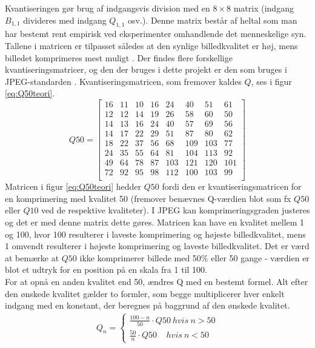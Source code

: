 Kvantiseringen gør brug af indgangsvis division med en $8 \times 8$ matrix (indgang $B_{1,1}$ divideres med indgang $Q_{1,1}$ osv.). Denne matrix består af heltal som man har bestemt rent empirisk ved eksperimenter omhandlende det menneskelige syn. Tallene i matricen er tilpasset således at den synlige billedkvalitet er høj, mens billedet komprimeres mest muligt \citep{lokminglui}. Der findes flere forskellige kvantiseringsmatricer, og den der bruges i dette projekt er den som bruges i JPEG-standarden \citep{lokminglui}. Kvantiseringsmatricen, som fremover kaldes $Q$, ses i figur \ref{eq:Q50teori}.
\begin{equation}
Q50 =
\begin{bmatrix}
	16	&	11	& 10		& 16		& 	24	&	40	& 51		& 61		\\
	12	&	12	& 14		& 19		& 	26	& 	58	& 60		& 50		\\
	14	&	13	& 16		& 24		& 	40	& 	57	& 69		& 56		\\
	14	&	17	& 22		& 29		& 	51	& 	87	& 80		& 62		\\
	18	&	22	& 37		& 56		& 	68	& 	109	& 103	& 77		\\
	24	&	35	& 55		& 64		& 	81	& 	104	& 113	& 92		\\
	49	&	64	& 78		& 87		& 	103	& 	121	& 120	& 101	\\
	72	&	92	& 95		& 98		& 	112	& 	100	& 103	& 99		\\
\end{bmatrix}
\label{eq:Q50teori}
\end{equation}
Matricen i figur \vref{eq:Q50teori} hedder $Q50$ fordi den er kvantiseringsmatricen for en komprimering med kvalitet 50 (fremover benævnes Q-værdien blot som fx $Q50$ eller $Q10$ ved de respektive kvaliteter). I JPEG kan komprimeringsgraden justeres og det er med denne matrix dette gøres. Matricen kan have en kvalitet mellem 1 og 100, hvor 100 resulterer i laveste komprimering og højeste billedkvalitet, mens 1 omvendt resulterer i højeste komprimering og laveste billedkvalitet. Det er værd at bemærke at $Q50$ ikke komprimerer billede med 50\% eller 50 gange - værdien er blot et udtryk for en position på en skala fra 1 til 100.\\
For at opnå en anden kvalitet end 50, ændres Q med en bestemt formel. Alt efter den ønskede kvalitet gælder to formler, som begge multiplicerer hver enkelt indgang med en konstant, der beregnes på baggrund af den ønskede kvalitet.
\begin{align}
Q_n=\begin{cases}
	\frac{100-n}{50} \cdot Q50 \ hvis \ n > 50\\
	\frac{50}{n} \cdot Q50 \ \ \ \ \ hvis \ n < 50
\end{cases}
\end{align}
